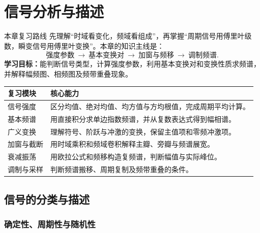 \chapter{信号分析与描述}
\label{chap:signal-analysis}

\begin{focusbox}{本章复习路线}
先理解“时域看变化，频域看组成”，再掌握“周期信号用傅里叶级数，瞬变信号用傅里叶变换”。本章的知识主线是：
\[
\text{强度参数}\ \longrightarrow\ \text{基本变换对}
\ \longrightarrow\ \text{加窗与频移}\ \longrightarrow\ \text{调制频谱}.
\]
\textbf{学习目标：}能判断信号类型，计算强度参数，利用基本变换对和变换性质求频谱，并解释幅频图、相频图及频带重叠现象。
\end{focusbox}

\begin{table}[H]
\centering\small
\begin{tabularx}{\linewidth}{@{}p{3.4cm} X@{}}
\toprule
复习模块 & 核心能力 \\
\midrule
信号强度 & 区分均值、绝对均值、均方值与方均根值，完成周期平均计算。 \\
基本频谱 & 用直接积分求单边指数频谱，并从复数表达式得到幅相谱。 \\
广义变换 & 理解符号、阶跃与冲激的变换，保留主值项和零频冲激项。 \\
加窗与截断 & 用时域乘积和频域卷积解释主瓣、旁瓣与频谱展宽。 \\
衰减振荡 & 用欧拉公式和频移构造复频谱，判断幅值与实际峰位。 \\
调制与采样 & 判断频谱搬移、周期复制及频带重叠的条件。 \\
\bottomrule
\end{tabularx}
\end{table}

\section{信号的分类与描述}

\subsection{确定性、周期性与随机性}



